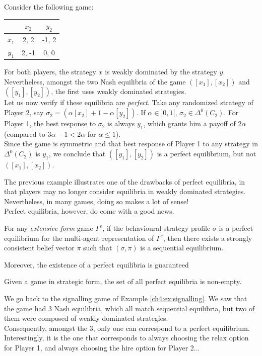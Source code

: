 \begin{example}
Consider the following game:
\begin{center}
\begin{tabular}{c | c  c}
& $x_2$ & $y_2$ \\
\hline
$x_1$ & 2, 2 & -1, 2 \\
$y_1$ & 2, -1 & 0, 0
\end{tabular}
\end{center}
For both players, the strategy $x$ is weakly dominated by the strategy $y$.
Nevertheless, amongst the two Nash equilibria of the game $([x_1],[x_2])$ and $([y_1],[y_2])$, the first uses weakly dominated strategies. \\
Let us now verify if these equilibria are \emph{perfect}.
Take  any randomized strategy of Player 2, say $\sigma_2 = (\alpha [x_2] + 1- \alpha [y_2])$. If $\alpha \in ]0,1[$, $\sigma_2 \in \Delta^0(C_2)$. For Player 1, the best response to $\sigma_2$ is always $y_1$, which grants him a payoff of $2 \alpha$ (compared to $3\alpha - 1 < 2 \alpha$ for $\alpha \leq 1$).\\
Since the game is symmetric and that  best response of Player 1 to any strategy in $\Delta^0(C_2)$ is $y_1$, we conclude that $([y_1], [y_2])$ is a perfect equilibrium, but not $([x_1],[x_2])$.
\end{example}

The previous example illustrates one of the drawbacks of perfect equilibria, in that players may no longer consider equilibria in weakly dominated strategies. Nevertheless, in many games, doing so makes a lot of sense!\\
Perfect equilibria, however, do come with a good news.
\begin{theorem}
For any \emph{extensive form} game $\Gamma^e$, if the behavioural strategy profile $\sigma$  is a perfect equilibrium for the multi-agent representation of $\Gamma^e$, then there exists a strongly consistent belief vector $\pi$ such that $(\sigma, \pi)$ is a sequential equilibrium.
\end{theorem}

Moreover, the existence of a perfect equilibria is guaranteed
\begin{theorem}
Given a game in strategic form, the set of all perfect equilibria is non-empty.
\end{theorem}
\begin{example}
We go back to the signalling game of Example \ref{ch4:ex:signalling}.
We saw that the game had 3 Nash equilibria, which all match sequential equilibria, but two of them were composed of weakly dominated strategies. \\
Consequently, amongst the 3, only one can correspond to a perfect equilibrium.
Interestingly, it is the one that corresponds to always choosing the relax option for Player 1, and always choosing the hire option for Player 2...
\end{example}

